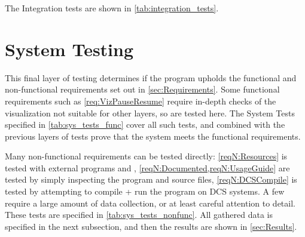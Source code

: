 The Integration tests are shown in \cref{tab:integration_tests}.



\section{System Testing}
This final layer of testing determines if the program upholds the functional and non-functional requirements set out in \cref{sec:Requirements}.
Some functional requirements such as \cref{req:VizPauseResume} require in-depth checks of the visualization not suitable for other layers, so are tested here.
The System Tests specified in \cref{tab:sys_tests_func} cover all such tests, and combined with the previous layers of tests prove that the system meets the functional requirements.

Many non-functional requirements can be tested directly: \cref{reqN:Resources} is tested with external programs  and , \cref{reqN:Documented,reqN:UsageGuide} are tested by simply inspecting the program and source files, \cref{reqN:DCSCompile} is tested by attempting to compile + run the program on DCS systems.
A few require a large amount of data collection, or at least careful attention to detail.
These tests are specified in \cref{tab:sys_tests_nonfunc}.
All gathered data is specified in the next subsection, and then the results are shown in \cref{sec:Results}.






